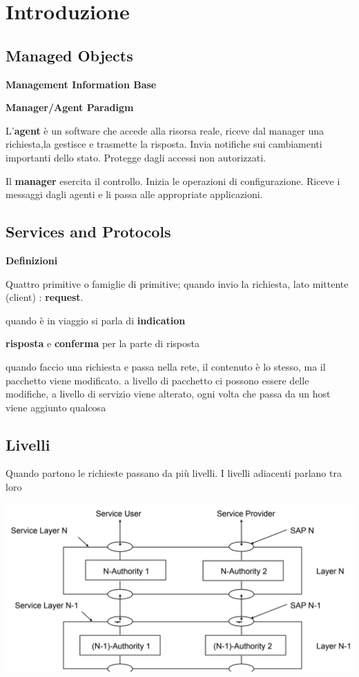 \documentclass{article}
\begin{document}
\section{Introduzione}
\subsection{Managed Objects}
\par \textbf{Management Information Base}

\par \textbf{Manager/Agent Paradigm}


L'\textbf{agent} è un software che accede alla risorsa reale, riceve dal manager una richiesta,la gestisce e trasmette la risposta.
Invia notifiche sui cambiamenti importanti dello stato.
Protegge dagli accessi non autorizzati.

Il \textbf{manager} esercita il controllo.
Inizia le operazioni di configurazione.
Riceve i messaggi dagli agenti e li passa alle appropriate applicazioni.

\subsection{Services and Protocols}
\par \textbf{Definizioni}

Quattro primitive o famiglie di primitive; quando invio la richiesta, lato mittente (client) : \textbf{request}.

quando è in viaggio si parla di \textbf{indication}

\textbf{risposta} e \textbf{conferma} per la parte di risposta 

quando faccio una richiesta e passa nella rete, il contenuto è lo stesso, ma il pacchetto viene modificato.
a livello di pacchetto ci possono essere delle modifiche, a livello di servizio viene alterato, ogni volta che passa da un host viene aggiunto qualcosa

\subsection{Livelli}
Quando partono le richieste passano da più livelli. I livelli adiacenti parlano tra loro

\includegraphics[width=\linewidth]{6.png}
\end{document}
